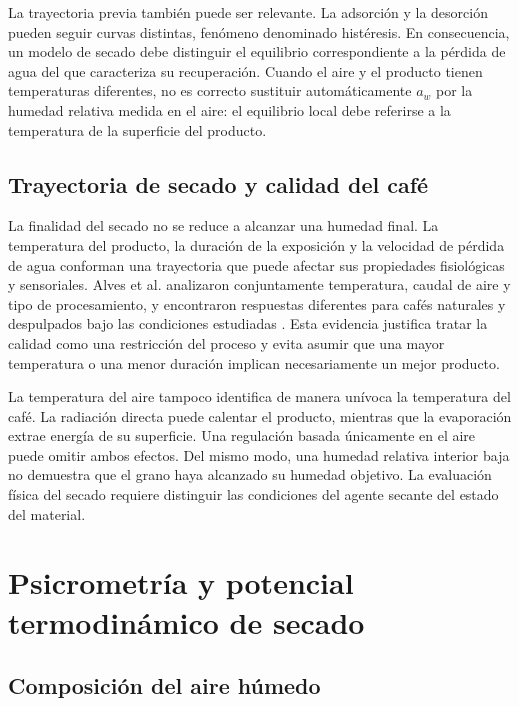 La trayectoria previa también puede ser relevante. La adsorción y la desorción pueden seguir curvas distintas, fenómeno denominado histéresis. En consecuencia, un modelo de secado debe distinguir el equilibrio correspondiente a la pérdida de agua del que caracteriza su recuperación. Cuando el aire y el producto tienen temperaturas diferentes, no es correcto sustituir automáticamente $a_w$ por la humedad relativa medida en el aire: el equilibrio local debe referirse a la temperatura de la superficie del producto.

\subsection{Trayectoria de secado y calidad del café}

La finalidad del secado no se reduce a alcanzar una humedad final. La temperatura del producto, la duración de la exposición y la velocidad de pérdida de agua conforman una trayectoria que puede afectar sus propiedades fisiológicas y sensoriales. Alves et al. analizaron conjuntamente temperatura, caudal de aire y tipo de procesamiento, y encontraron respuestas diferentes para cafés naturales y despulpados bajo las condiciones estudiadas \cite{alves2017}. Esta evidencia justifica tratar la calidad como una restricción del proceso y evita asumir que una mayor temperatura o una menor duración implican necesariamente un mejor producto.

La temperatura del aire tampoco identifica de manera unívoca la temperatura del café. La radiación directa puede calentar el producto, mientras que la evaporación extrae energía de su superficie. Una regulación basada únicamente en el aire puede omitir ambos efectos. Del mismo modo, una humedad relativa interior baja no demuestra que el grano haya alcanzado su humedad objetivo. La evaluación física del secado requiere distinguir las condiciones del agente secante del estado del material.



\section{Psicrometría y potencial termodinámico de secado}
\label{sec:psicrometria}

\subsection{Composición del aire húmedo}

